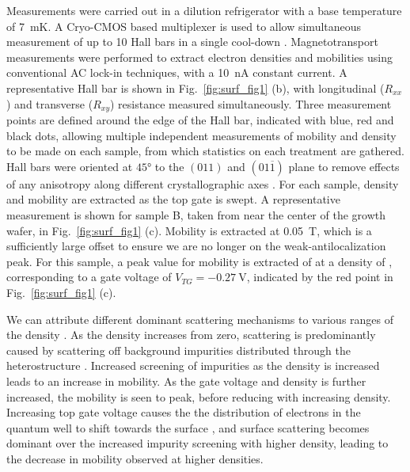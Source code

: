 Measurements were carried out in a dilution refrigerator with a base temperature of \SI{7}{\milli\kelvin}. A Cryo-CMOS based multiplexer is used to allow simultaneous measurement of up to 10 Hall bars in a single cool-down \cite{2019arXiv190807685P}. Magnetotransport measurements were performed to extract electron densities and mobilities using conventional AC lock-in techniques, with a \SI{10}{\nano\ampere} constant current. A representative Hall bar is shown in Fig.~\ref{fig:surf_fig1} (b), with longitudinal ($R_{xx}$) and transverse ($R_{xy}$) resistance measured simultaneously. Three measurement points are defined around the edge of the Hall bar, indicated with blue, red and black dots, allowing multiple independent measurements of mobility and density to be made on each sample, from which statistics on each treatment are gathered. Hall bars were oriented at $\ang{45}$ to the $(011)$ and $(01\overline{1})$ plane to remove effects of any anisotropy along different crystallographic axes \cite{PhysRevB.67.045309,PhysRevB.77.235307}. For each sample, density and mobility are extracted as the top gate is swept. A representative measurement is shown for sample B, taken from near the center of the growth wafer, in Fig.~\ref{fig:surf_fig1} (c). Mobility is extracted at \SI{0.05}{\tesla}, which is a sufficiently large offset to ensure we are no longer on the weak-antilocalization peak. For this sample, a peak value for mobility is extracted of  at a density of , corresponding to a gate voltage of $V_{TG} = \SI{-0.27}{\volt}$, indicated by the red point in Fig.~\ref{fig:surf_fig1} (c).

We can attribute different dominant scattering mechanisms to various ranges of the density \cite{Matsumoto_1974,PhysRevB.32.8126,PhysRevB.16.4446}. As the density increases from zero, scattering is predominantly caused by scattering off background impurities distributed through the heterostructure \cite{scattering}. Increased screening of impurities as the density is increased leads to an increase in mobility. As the gate voltage and density is further increased, the mobility is seen to peak, before reducing with increasing density. Increasing top gate voltage causes the the distribution of electrons in the quantum well to shift towards the surface \cite{doi:10.1063/1.119829,PhysRevB.93.235312}, and surface scattering becomes dominant over the increased impurity screening with higher density, leading to the decrease in mobility observed at higher densities.


